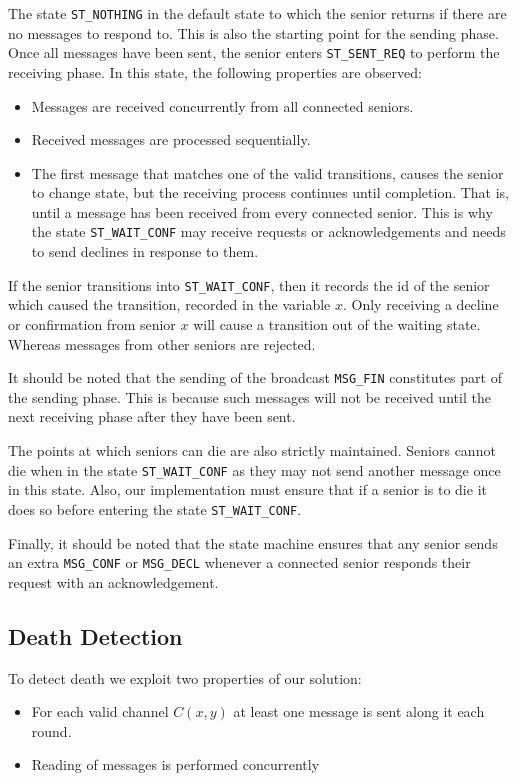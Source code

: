\documentclass[12pt,a4paper]{scrartcl}
\begin{document}
The state \texttt{ST\_NOTHING} in the default state to which the senior returns if there are no messages to respond to.
This is also the starting point for the sending phase. Once all messages have been sent, the senior enters \texttt{ST\_SENT\_REQ} to perform the receiving phase.
In this state, the following properties are observed:
\begin{itemize}
    \item Messages are received concurrently from all connected seniors.
    \item Received messages are processed sequentially.
    \item The first message that matches one of the valid transitions, causes the senior to change state, but the receiving process continues until completion.
          That is, until a message has been received from every connected senior.
          This is why the state \texttt{ST\_WAIT\_CONF} may receive requests or acknowledgements and needs to send declines in response to them.
\end{itemize}

If the senior transitions into \texttt{ST\_WAIT\_CONF}, then it records the id of the senior which caused the transition, recorded in the variable $x$.
Only receiving a decline or confirmation from senior $x$ will cause a transition out of the waiting state.
Whereas messages from other seniors are rejected.

It should be noted that the sending of the broadcast \texttt{MSG\_FIN} constitutes part of the sending phase.
This is because such messages will not be received until the next receiving phase after they have been sent.

The points at which seniors can die are also strictly maintained.
Seniors cannot die when in the state \texttt{ST\_WAIT\_CONF} as they may not send another message once in this state.
Also, our implementation must ensure that if a senior is to die it does so before entering the state \texttt{ST\_WAIT\_CONF}.

Finally, it should be noted that the state machine ensures that any senior sends an extra \texttt{MSG\_CONF} or \texttt{MSG\_DECL} whenever a connected senior responds their request with an acknowledgement.

\subsection{Death Detection}
To detect death we exploit two properties of our solution:
\begin{itemize}
    \item For each valid channel $C(x,y)$ at least one message is sent along it each round.
    \item Reading of messages is performed concurrently
\end{itemize}
\end{document}
